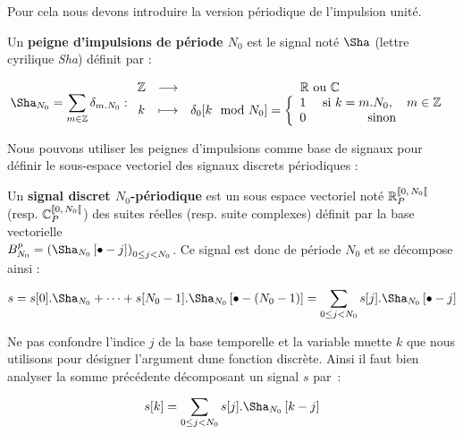 Pour cela nous devons introduire la version périodique de l'impulsion unité.

\begin{definition}
  Un \textbf{peigne d'impulsions de période $N_0$} est le signal noté
  $\Sha$ (lettre cyrilique \emph{Sha}) définit par :
  
  \begin{equation}
    \Sha_{N_0} = \sum\limits_{m\in\mathbb{Z}} \delta_{m.N_0}: \application{\Z}{\R \text{ ou } \C}{k}{\delta_0[k\mod{}N_0]=\pparMorceaux{1}{\text{ si } k = m.N_0,\quad m\in\Z}{0}{\text{ sinon}}}
\end{equation}

\end{definition}

Nous pouvons utiliser les peignes d'impulsions comme base de signaux pour définir le sous-espace vectoriel des signaux discrets périodiques :
\begin{definition}
  \label{def:signal_discret_periodique}
  Un \textbf{signal discret $N_0$-périodique}  est un sous espace vectoriel noté
  $\RNper$ (resp. $\CNper$) des suites réelles (resp. suite
  complexes) définit par la base vectorielle \\$B_{N_0}^p=\left(\Sha_{N_0}\b{\bullet-j}\right)_{0\leq j<N_0}$. Ce signal est donc de période $N_0$ et se décompose ainsi :
  \begin{equation}
  s = s[0].\Sha_{N_0} + \dots + s[N_0-1].\Sha_{N_0}\b{\bullet-(N_0-1)} = \somme{0\leq j< N_0}{}{s[j].\Sha_{N_0}\b{\bullet-j}}
  \end{equation}
\end{definition}

Ne pas confondre l'indice
$j$ de la base temporelle et la variable muette
$k$ que nous utilisons pour désigner l'argument dune fonction
discrète. Ainsi il faut bien analyser la somme précédente décomposant
un signal $s$ par~:
\begin{equation}
  s[k] = \somme{0\leq j< N_0}{}{s[j].\Sha_{N_0}\b{k-j}}
\end{equation}

